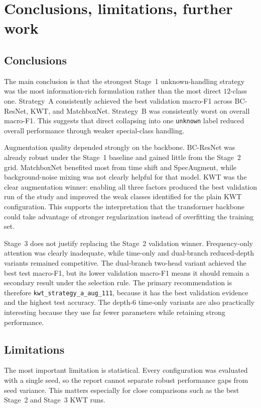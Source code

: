 \documentclass[11pt]{article}
\begin{document}
\clearpage

\section{Conclusions, limitations, further work}
\label{sec:conclusions}
\subsection*{Conclusions}

The main conclusion is that the strongest Stage~1 unknown-handling strategy was the most information-rich formulation rather than the most direct \(12\)-class one. Strategy~A consistently achieved the best validation macro-F1 across BC-ResNet, KWT, and MatchboxNet. Strategy~B was consistently worst on overall macro-F1. This suggests that direct collapsing into one \texttt{unknown} label reduced overall performance through weaker special-class handling.

Augmentation quality depended strongly on the backbone. BC-ResNet was already robust under the Stage~1 baseline and gained little from the Stage~2 grid. MatchboxNet benefited most from time shift and SpecAugment, while background-noise mixing was not clearly helpful for that model. KWT was the clear augmentation winner: enabling all three factors produced the best validation run of the study and improved the weak classes identified for the plain KWT configuration. This supports the interpretation that the transformer backbone could take advantage of stronger regularization instead of overfitting the training set.

Stage~3 does not justify replacing the Stage~2 validation winner. Frequency-only attention was clearly inadequate, while time-only and dual-branch reduced-depth variants remained competitive. The dual-branch two-head variant achieved the best test macro-F1, but its lower validation macro-F1 means it should remain a secondary result under the selection rule. The primary recommendation is therefore \texttt{kwt\_strategy\_a\_aug\_111}, because it has the best validation evidence and the highest test accuracy. The depth-\(6\) time-only variants are also practically interesting because they use far fewer parameters while retaining strong performance.

\subsection*{Limitations}

The most important limitation is statistical. Every configuration was evaluated with a single seed, so the report cannot separate robust performance gaps from seed variance. This matters especially for close comparisons such as the best Stage~2 and Stage~3 KWT runs.
\end{document}
